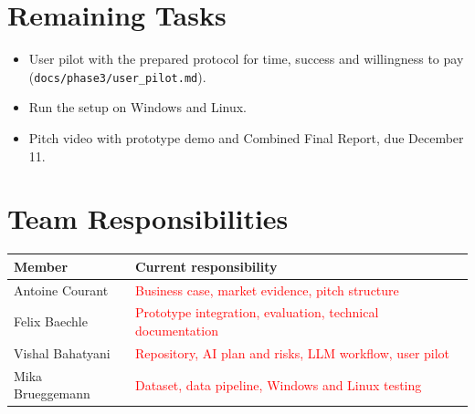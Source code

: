 \documentclass[10pt,letterpaper]{article}
\newcommand{\confirm}[1]{\textcolor{red}{#1}}
\begin{document}
\section{Remaining Tasks}
\begin{itemize}
  \item User pilot with the prepared protocol for time, success and willingness to pay (\texttt{docs/phase3/user\_pilot.md}).
  \item Run the setup on Windows and Linux.
  \item Pitch video with prototype demo and Combined Final Report, due December 11.
\end{itemize}

\section{Team Responsibilities}
\small
\begin{tabularx}{\linewidth}{@{}lX@{}}
  \toprule
  Member & Current responsibility \\
  \midrule
  Antoine Courant & \confirm{Business case, market evidence, pitch structure} \\
  Felix Baechle & \confirm{Prototype integration, evaluation, technical documentation} \\
  Vishal Bahatyani & \confirm{Repository, AI plan and risks, LLM workflow, user pilot} \\
  Mika Brueggemann & \confirm{Dataset, data pipeline, Windows and Linux testing} \\
  \bottomrule
\end{tabularx}
\end{document}
